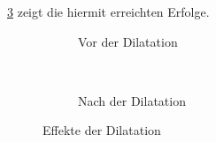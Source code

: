 \cref{fig:dilat_dilat-change} zeigt die hiermit erreichten Erfolge.

\begin{figure}[H]
	\centering
	\begin{subfigure}[t]{0.45\textwidth}
		\centering
		\caption{Vor der Dilatation}
		\label{fig:dilat_pre}
	\end{subfigure}
	~
	\begin{subfigure}[t]{0.45\textwidth}
		\centering
		\caption{Nach der Dilatation}
		\label{fig:dilat_post}
	\end{subfigure}
	\caption{Effekte der Dilatation}
	\label{fig:dilat_dilat-change}
\end{figure}